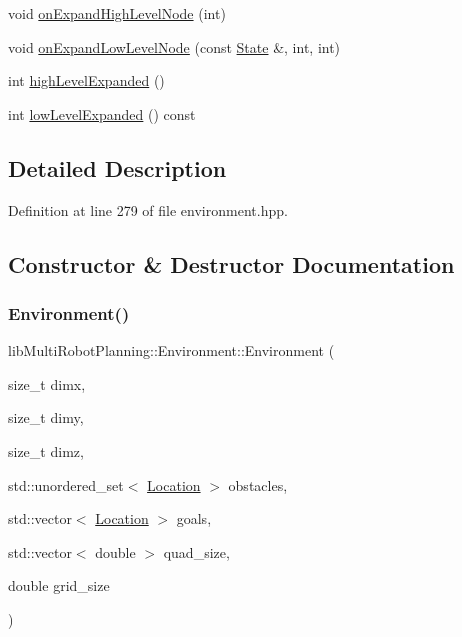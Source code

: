\begin{DoxyCompactItemize}
\item 
void \hyperlink{classlib_multi_robot_planning_1_1_environment_a5ce6ca98a37286cfe865b2b52b6c65aa}{on\+Expand\+High\+Level\+Node} (int)
\item 
void \hyperlink{classlib_multi_robot_planning_1_1_environment_a022450370c58811b6407650e72a11230}{on\+Expand\+Low\+Level\+Node} (const \hyperlink{structlib_multi_robot_planning_1_1_state}{State} \&, int, int)
\item 
int \hyperlink{classlib_multi_robot_planning_1_1_environment_ad3e27d5501dc54151814e015373e3ef7}{high\+Level\+Expanded} ()
\item 
int \hyperlink{classlib_multi_robot_planning_1_1_environment_a9dfe6761bd0b6d25628146cabfc08952}{low\+Level\+Expanded} () const
\end{DoxyCompactItemize}


\subsection{Detailed Description}


Definition at line 279 of file environment.\+hpp.



\subsection{Constructor \& Destructor Documentation}
\mbox{\label{classlib_multi_robot_planning_1_1_environment_a9206e2bb7f685366383be977bba38979}} 
\subsubsection{\texorpdfstring{Environment()}{Environment()}\hspace{0.1cm}{\footnotesize\ttfamily [1/2]}}
{\footnotesize\ttfamily lib\+Multi\+Robot\+Planning\+::\+Environment\+::\+Environment (\begin{DoxyParamCaption}\item[{size\+\_\+t}]{dimx,  }\item[{size\+\_\+t}]{dimy,  }\item[{size\+\_\+t}]{dimz,  }\item[{std\+::unordered\+\_\+set$<$ \hyperlink{structlib_multi_robot_planning_1_1_location}{Location} $>$}]{obstacles,  }\item[{std\+::vector$<$ \hyperlink{structlib_multi_robot_planning_1_1_location}{Location} $>$}]{goals,  }\item[{std\+::vector$<$ double $>$}]{quad\+\_\+size,  }\item[{double}]{grid\+\_\+size }\end{DoxyParamCaption})\hspace{0.3cm}{\ttfamily [inline]}}




